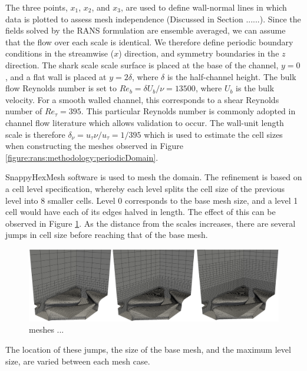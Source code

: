 \documentclass[12pt,oneside,a4paper]{article}
\begin{document}
%
The three points, $x_1$, $x_2$, and $x_3$, are used to define wall-normal lines in which data is plotted to assess mesh independence (Discussed in Section ......). Since the fields solved by the RANS formulation are ensemble averaged, we can assume that the flow over each scale is identical. We therefore define periodic boundary conditions in the streamwise ($x$) direction, and symmetry boundaries in the $z$ direction. The shark scale scale surface is placed at the base of the channel, $y=0$, and a flat wall is placed at $y=2 \delta$, where $\delta$ is the half-channel height. The bulk flow Reynolds number is set to $Re_b = \delta U_b/ \nu = 13500$, where $U_b$ is the bulk velocity. For a smooth walled channel, this corresponds to a shear Reynolds number of $Re_\tau = 395$. This particular Reynolds number is commonly adopted in channel flow literature which allows validation to occur. The wall-unit length scale is therefore $\delta_\nu = u_\tau \nu /u_\tau = 1/395$ which is used to estimate the cell sizes when constructing the meshes observed in Figure \ref{figure:rans:methodology:periodicDomain}.

SnappyHexMesh software is used to mesh the domain. The refinement is based on a cell level specification, whereby each level splits the cell size of the previous level into 8 smaller cells. Level 0 corresponds to the base mesh size, and a level 1 cell would have each of its edges halved in length. The effect of this can be observed in Figure \ref{figure:rans:methodology:meshExamples}. As the distance from the scales increases, there are several jumps in cell size before reaching that of the base mesh.
%
\begin{figure}[!b]
\centering
\includegraphics[width = \linewidth]{images/CFD_meshIndependence/meshExamples.png}
\caption{meshes ...}
\label{figure:rans:methodology:meshExamples}
\end{figure}
%
 The location of these jumps, the size of the base mesh, and the maximum level size, are varied between each mesh case.
 
\end{document}
